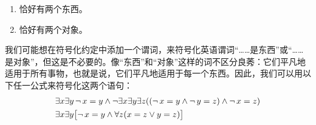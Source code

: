 \begin{enumerate}
\item\label{exactly2things} 恰好有两个东西。
\item\label{exactly2objects} 恰好有两个对象。
\end{enumerate}


我们可能想在符号化约定中添加一个谓词，来符号化英语谓词“……是东西”或“……是对象”，但这是不必要的。像“东西”和“对象”这样的词不区分良莠：它们平凡地适用于所有事物，也就是说，它们平凡地适用于每一个东西。因此，我们可以用以下任一公式来符号化这两个语句：
\begin{align*}
	& \exists x \exists y\,\neg\, {x = y} \wedge  \neg \exists x \exists y \exists z ((\neg\, {x = y} \wedge \neg\, {y = z}) \wedge \neg\, {x = z}) \\
	& \exists x \exists y \bigl[\neg\, {x = y} \wedge \forall z(x=z \vee y = z)\bigr]
\end{align*}

\practiceproblems


